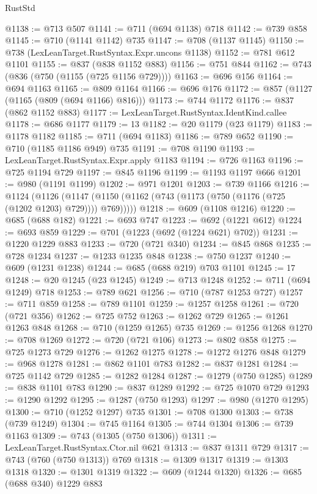 \begin{lexlean}{RustStd}
\begin{coremodule}
@1138 := @713 @507
@1141 := @711 (@694 @1138) @718
@1142 := @739 @858
@1145 := @710 (@1141 @1142) @735
@1147 := @708 (@1137 @1145)
@1150 := @738 (LexLeanTarget.RustSyntax.Expr.uncons @1138)
@1152 := @781 @612 @1101
@1155 := @837 (@838 @1152 @883)
@1156 := @751 @844
@1162 := @743 (@836 (@750 (@1155 (@725 @1156 @729))))
@1163 := @696 @156
@1164 := @694 @1163
@1165 := @809 @1164
@1166 := @696 @176
@1172 := @857 (@1127 (@1165 (@809 (@694 @1166) @816)))
@1173 := @744 @1172
@1176 := @837 (@862 @1152 @883)
@1177 := LexLeanTarget.RustSyntax.IdentKind.callee
@1178 := @686 @1177
@1179 := 13
@1182 := @20 @1179 (@23 @1179)
@1183 := @1178 @1182
@1185 := @711 (@694 @1183)
@1186 := @789 @652
@1190 := @710 (@1185 @1186 @949) @735
@1191 := @708 @1190
@1193 := LexLeanTarget.RustSyntax.Expr.apply @1183
@1194 := @726 @1163
@1196 := @725 @1194 @729
@1197 := @845 @1196
@1199 := @1193 @1197 @666
@1201 := @980 (@1191 @1199)
@1202 := @971 @1201
@1203 := @739 @1166
@1216 := @1124
    (@1126 (@1147 (@1150 (@1162 (@743 (@1173 (@750 (@1176 (@725 (@1202 @1203) @729)))) @769)))))
@1218 := @609 (@1108 @1216)
@1220 := @685 (@688 @182)
@1221 := @693 @747
@1223 := @692 (@1221 @612)
@1224 := @693 @859
@1229 := @701 (@1223 (@692 (@1224 @621) @702))
@1231 := @1220 @1229 @883
@1233 := @720 (@721 @340)
@1234 := @845 @868
@1235 := @728 @1234
@1237 := @1233 @1235 @848
@1238 := @750 @1237
@1240 := @609 (@1231 @1238)
@1244 := @685 (@688 @219) @703 @1101
@1245 := 17
@1248 := @20 @1245 (@23 @1245)
@1249 := @713 @1248
@1252 := @711 (@694 @1249) @718
@1253 := @789 @621
@1256 := @710 (@787 @1253 @727)
@1257 := @711 @859
@1258 := @789 @1101
@1259 := @1257 @1258
@1261 := @720 (@721 @356)
@1262 := @725 @752
@1263 := @1262 @729
@1265 := @1261 @1263 @848
@1268 := @710 (@1259 @1265) @735
@1269 := @1256 @1268
@1270 := @708 @1269
@1272 := @720 (@721 @106)
@1273 := @802 @858
@1275 := @725 @1273 @729
@1276 := @1262 @1275
@1278 := @1272 @1276 @848
@1279 := @968 @1278
@1281 := @862 @1101 @783
@1282 := @837 @1281
@1284 := @725 @1142 @729
@1285 := @1282 @1284
@1287 := @1279 (@750 @1285)
@1289 := @838 @1101 @783
@1290 := @837 @1289
@1292 := @725 @1070 @729
@1293 := @1290 @1292
@1295 := @1287 (@750 @1293)
@1297 := @980 (@1270 @1295)
@1300 := @710 (@1252 @1297) @735
@1301 := @708 @1300
@1303 := @738 (@739 @1249)
@1304 := @745 @1164
@1305 := @744 @1304
@1306 := @739 @1163
@1309 := @743 (@1305 (@750 @1306))
@1311 := LexLeanTarget.RustSyntax.Ctor.nil @621
@1313 := @837 @1311 @729
@1317 := @743 (@760 (@750 @1313)) @769
@1318 := @1309 @1317
@1319 := @1303 @1318
@1320 := @1301 @1319
@1322 := @609 (@1244 @1320)
@1326 := @685 (@688 @340) @1229 @883

\end{coremodule}
\end{lexlean}

